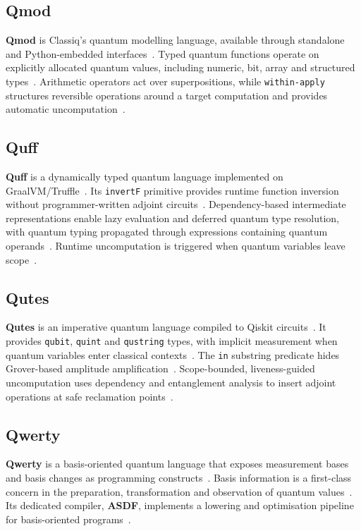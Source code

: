 \subsection{Qmod}\label{subsec:system_descriptions:qmod}
\textbf{Qmod} is Classiq's quantum modelling language, available through standalone and Python-embedded interfaces~\cite{vax2025qmodexpressivehighlevelquantum}.
Typed quantum functions operate on explicitly allocated quantum values, including numeric, bit, array and structured types~\cite{vax2025qmodexpressivehighlevelquantum}.
Arithmetic operators act over superpositions, while \texttt{within-apply} structures reversible operations around a target computation and provides automatic uncomputation~\cite{vax2025qmodexpressivehighlevelquantum}.

\subsection{Quff}\label{subsec:system_descriptions:quff}
\textbf{Quff} is a dynamically typed quantum language implemented on GraalVM/Truffle~\cite{wright2024quff}.
Its \texttt{invertF} primitive provides runtime function inversion without programmer-written adjoint circuits~\cite{wright2024quff}.
Dependency-based intermediate representations enable lazy evaluation and deferred quantum type resolution, with quantum typing propagated through expressions containing quantum operands~\cite{wright2024quff}.
Runtime uncomputation is triggered when quantum variables leave scope~\cite{wright2024quff}.

\subsection{Qutes}\label{subsec:system_descriptions:qutes}
\textbf{Qutes} is an imperative quantum language compiled to Qiskit circuits~\cite{faro2025qutes}.
It provides \texttt{qubit}, \texttt{quint} and \texttt{qustring} types, with implicit measurement when quantum variables enter classical contexts~\cite{faro2025qutes}.
The \texttt{in} substring predicate hides Grover-based amplitude amplification~\cite{faro2025qutes}.
Scope-bounded, liveness-guided uncomputation uses dependency and entanglement analysis to insert adjoint operations at safe reclamation points~\cite{faro2025qutes,reversiblelifetime2026}.

\subsection{Qwerty}\label{subsec:system_descriptions:qwerty}
\textbf{Qwerty} is a basis-oriented quantum language that exposes measurement bases and basis changes as programming constructs~\cite{adams2024qwerty}.
Basis information is a first-class concern in the preparation, transformation and observation of quantum values~\cite{adams2024qwerty}.
Its dedicated compiler, \textbf{ASDF}, implements a lowering and optimisation pipeline for basis-oriented programs~\cite{adams2025asdf}.

